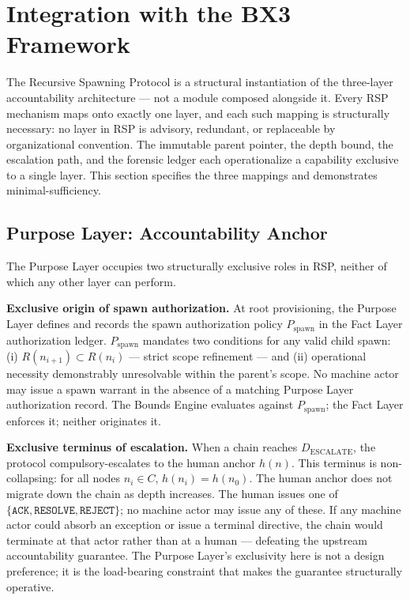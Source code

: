 \section{Integration with the BX3 Framework}
\label{sec:bx3-integration}

The Recursive Spawning Protocol is a structural instantiation of the \bxthree three-layer accountability architecture — not a module composed alongside it. Every RSP mechanism maps onto exactly one \bxthree layer, and each such mapping is structurally necessary: no layer in RSP is advisory, redundant, or replaceable by organizational convention. The immutable parent pointer, the depth bound, the escalation path, and the forensic ledger each operationalize a capability exclusive to a single layer. This section specifies the three mappings and demonstrates minimal-sufficiency.

\subsection{Purpose Layer: Accountability Anchor}
\label{sec:purpose-anchor}

The Purpose Layer occupies two structurally exclusive roles in RSP, neither of which any other layer can perform.

\medskip
\noindent\textbf{Exclusive origin of spawn authorization.} At root provisioning, the Purpose Layer defines and records the spawn authorization policy $P_{\mathrm{spawn}}$ in the Fact Layer authorization ledger. $P_{\mathrm{spawn}}$ mandates two conditions for any valid child spawn: (i) $R(n_{i+1}) \subset R(n_i)$ — strict scope refinement — and (ii) operational necessity demonstrably unresolvable within the parent's scope. No machine actor may issue a spawn warrant in the absence of a matching Purpose Layer authorization record. The Bounds Engine evaluates against $P_{\mathrm{spawn}}$; the Fact Layer enforces it; neither originates it.

\medskip
\noindent\textbf{Exclusive terminus of escalation.} When a chain reaches $D_{\mathrm{ESCALATE}}$, the protocol compulsory-escalates to the human anchor $h(n)$. This terminus is non-collapsing: for all nodes $n_i \in C$, $h(n_i) = h(n_0)$. The human anchor does not migrate down the chain as depth increases. The human issues one of $\{\texttt{ACK}, \texttt{RESOLVE}, \texttt{REJECT}\}$; no machine actor may issue any of these. If any machine actor could absorb an exception or issue a terminal directive, the chain would terminate at that actor rather than at a human — defeating the upstream \bxthree accountability guarantee. The Purpose Layer's exclusivity here is not a design preference; it is the load-bearing constraint that makes the guarantee structurally operative.

